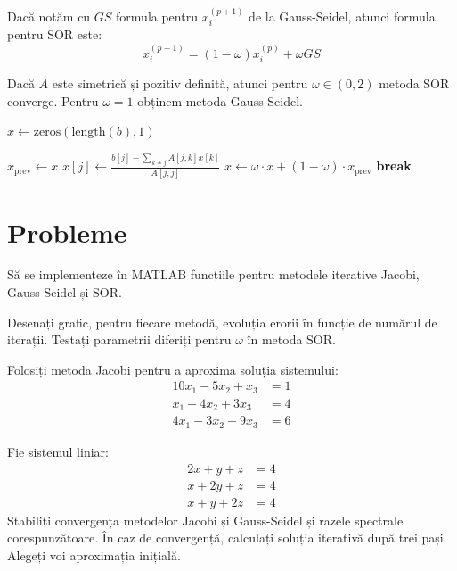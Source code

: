 \documentclass{exam}
\begin{document}
Dacă notăm cu $GS$ formula pentru $x_i^{(p+1)}$ de la Gauss-Seidel, atunci
formula pentru SOR este:
\begin{equation*}
	x_i^{(p+1)} = (1 - \omega) x_i^{(p)} + \omega GS
\end{equation*}

Dacă $A$ este simetrică și pozitiv definită, atunci pentru $\omega \in (0, 2)$
metoda SOR converge. Pentru $\omega = 1$ obținem metoda Gauss-Seidel.

\newpage
\begin{algorithm}
	\caption{Metoda SOR}
	\begin{algorithmic}[1]
		\State \( x \gets \text{zeros}(\text{length}(b),1) \) 

		\State \( x_{\text{prev}} \gets x \)
		\State \( x[j] \gets \frac{b[j] - \sum_{k \neq j}^{} A[j,k] x[k]}{A[j,j]} \)
		\EndFor
		\State \( x \gets \omega \cdot x + (1 - \omega) \cdot x_{\text{prev}} \) 
		\State \textbf{break}
		\EndIf
		\EndFor
	\end{algorithmic}
\end{algorithm}

\section{Probleme}

\begin{questions}
	\question Să se implementeze în MATLAB funcțiile pentru metodele iterative
	Jacobi, Gauss-Seidel și SOR.

	\question Desenați grafic, pentru fiecare metodă, evoluția erorii în funcție
	de numărul de iterații. Testați parametrii diferiți pentru $\omega$ în
	metoda SOR.

	\question Folosiți metoda Jacobi pentru a aproxima soluția sistemului:
	\begin{align*}
		10x_1 - 5x_2 + x_3  & = 1 \\
		x_1 + 4x_2 + 3 x_3  & = 4 \\
		4x_1 - 3 x_2 - 9x_3 & = 6
	\end{align*}

	\question Fie sistemul liniar:
	\begin{align*}
		2x + y + z & = 4 \\
		x + 2y + z & = 4 \\
		x + y + 2z & = 4
	\end{align*}
	Stabiliți convergența metodelor Jacobi și Gauss-Seidel și razele spectrale
	corespunzătoare. În caz de convergență, calculați soluția iterativă după
	trei pași. Alegeți voi aproximația inițială.

\end{questions}



\end{document}
